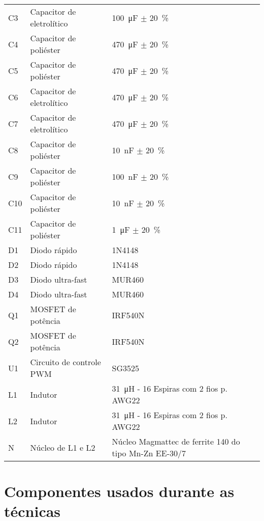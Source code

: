 \begin{apendicesenv}
\begin{table}[htbp]
\begin{tabular}{@{}|m{}|m{}|m{}|@{}}
	            C3	&	Capacitor de eletrolítico	&	\qty{100}{\micro\farad} $\pm$ \qty{20}{\percent}\\
	            C4	&	Capacitor de poliéster	    &	\qty{470}{\micro\farad} $\pm$ \qty{20}{\percent}\\
	            C5	&	Capacitor de poliéster	    &	\qty{470}{\micro\farad} $\pm$ \qty{20}{\percent}\\
	            C6	&	Capacitor de eletrolítico	&	\qty{470}{\micro\farad} $\pm$ \qty{20}{\percent}\\
	            C7	&	Capacitor de eletrolítico	&	\qty{470}{\micro\farad} $\pm$ \qty{20}{\percent}\\
	            C8	&	Capacitor de poliéster	    &	\qty{10}{\nano\farad} $\pm$ \qty{20}{\percent}\\
	            C9	&	Capacitor de poliéster	    &	\qty{100}{\nano\farad} $\pm$ \qty{20}{\percent}\\
	            C10	&	Capacitor de poliéster	    &	\qty{10}{\nano\farad} $\pm$ \qty{20}{\percent}\\
	            C11	&	Capacitor de poliéster	    &	\qty{1}{\micro\farad} $\pm$ \qty{20}{\percent}\\
	            D1	&	Diodo rápido                &	1N4148\\
	            D2	&	Diodo rápido                &	1N4148\\
	            D3	&	Diodo ultra-fast            &	MUR460\\
	            D4	&	Diodo ultra-fast            &	MUR460\\
	            Q1	&	MOSFET de potência          &	IRF540N\\
	            Q2	&	MOSFET de potência          &	IRF540N\\
	            U1	&	Circuito de controle PWM    &	SG3525\\
	            L1	&	Indutor             	    &	\qty{31}{\micro\henry} - 16 Espiras com 2 fios p. AWG22  \\
	            L2	&	Indutor             	    &	\qty{31}{\micro\henry} - 16 Espiras com 2 fios p. AWG22  \\
	            N   &	Núcleo de L1 e L2           &	Núcleo Magmattec de ferrite 140 do tipo Mn-Zn EE-30/7 \\
	            \hline
	        \end{tabular}
	    \end{table}
	
	\chapter{Componentes usados durante as técnicas}
	

\end{apendicesenv}
